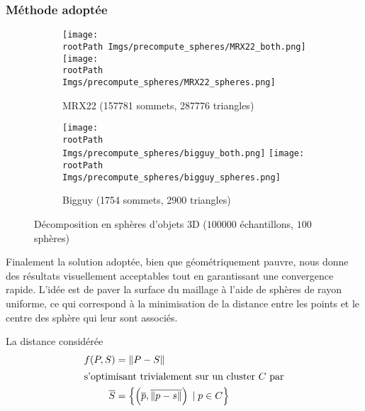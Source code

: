 \documentclass[10pt,a4paper,twoside, twocolumn]{report}
\newcommand*{\rootPath}{../}
\begin{document}
\subsubsection{Méthode adoptée}

\begin{figure}[!ht]\centering
	\begin{subfigure}[b]{0.4\textwidth}\centering
		\texttt{[image: \\rootPath Imgs/precompute\_spheres/MRX22\_both.png]}
		\vspace{0.5cm}
		\texttt{[image: \\rootPath Imgs/precompute\_spheres/MRX22\_spheres.png]}
		\caption{MRX22 (157781 sommets, 287776 triangles)}
	\end{subfigure}
	\begin{subfigure}[b]{0.4\textwidth}\centering
		\texttt{[image: \\rootPath Imgs/precompute\_spheres/bigguy\_both.png]}
		\vspace{0.5cm}
		\texttt{[image: \\rootPath Imgs/precompute\_spheres/bigguy\_spheres.png]}
		\caption{Bigguy (1754 sommets, 2900 triangles)}
	\end{subfigure}
	
	\caption{Décomposition en sphères d'objets 3D ($100000$ échantillons, $100$ sphères)}
	\label{fig:precompute_sphere:result}
\end{figure}

Finalement la solution adoptée, bien que géométriquement pauvre, nous donne des résultats visuellement acceptables tout en garantissant une convergence rapide. L'idée est de paver la surface du maillage à l'aide de sphères de rayon uniforme, ce qui correspond à la minimisation de la distance entre les points et le centre des sphère qui leur sont associés.

La distance considérée
\begin{align}
	f(P, S)			&= \left\|P-S\right\|	\\
\intertext{s'optimisant trivialement sur un cluster $C$ par}
	\overline S	&= \left\{ \left(\overline p, \overline{\|p-s\|}\right)\;|\;p \in C \right\}
\end{align}


\ifstandalone
	
	
\fi
\end{document}
